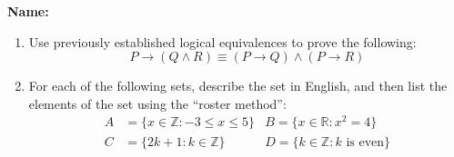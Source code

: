 \documentclass[12pt]{article}
\newcommand{\points}[1]{\marginpar{\hspace{24pt}[#1]}}
\newcommand{\R}{\mathbb{R}}
\newcommand{\Z}{\mathbb{Z}}
\begin{document}
{\bf Name:}
\thispagestyle{fancy}

 \begin{enumerate}
 \item  Use previously established logical equivalences to prove the following:\points{6}
\[
 P\to (Q\wedge R)\equiv (P\to Q)\wedge (P\to R)
\]

\vspace{4in}

\item For each of the following sets, describe the set in English, and then list the elements of the set using the ``roster method'':
\begin{align*}
 A &= \{x\in \mathbb{Z} : -3\leq x\leq 5\}  & B = \{x\in\R : x^2=4\}\\
 C &= \{2k+1 : k\in \Z\} & D = \{k\in\mathbb{Z} : k \text{ is even}\}
\end{align*}

 \end{enumerate}
\end{document}
